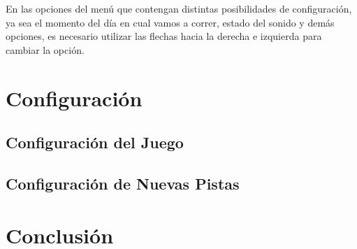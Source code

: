 \documentclass[a4paper,10pt]{article}
\begin{document}
En las opciones del menú que contengan distintas posibilidades de
configuración, ya sea el momento del día en cual vamos a correr, estado del
sonido y demás opciones, es necesario utilizar las flechas hacia la derecha e
izquierda para cambiar la opción.
\section{Configuración}
\label{configuracion}

\subsection{Configuración del Juego}

\subsection{Configuración de Nuevas Pistas}

\section{Conclusión}
\label{conclusiones}
\end{document}
